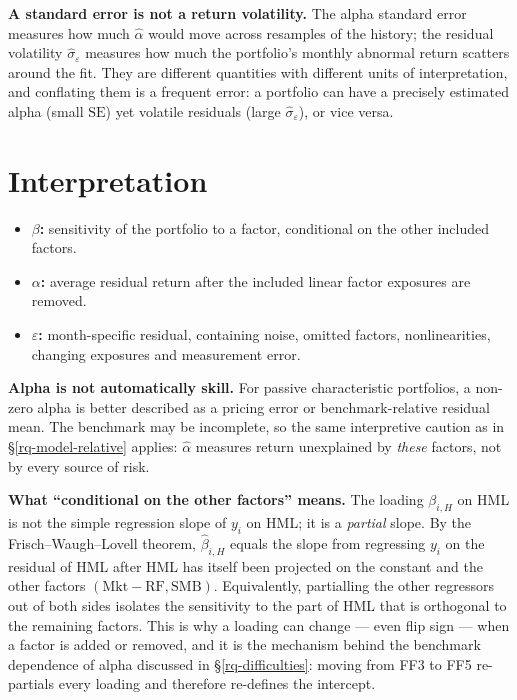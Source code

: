 \textbf{A standard error is not a return volatility.} The alpha standard
error measures how much $\hat\alpha$ would move across resamples of the
history; the residual volatility $\hat\sigma_\varepsilon$ measures how much
the portfolio's monthly abnormal return scatters around the fit. They are
different quantities with different units of interpretation, and conflating
them is a frequent error: a portfolio can have a precisely estimated alpha
(small $\mathrm{SE}$) yet volatile residuals (large
$\hat\sigma_\varepsilon$), or vice versa.

\hypertarget{toy-example-interpretation}{%
\section{Interpretation}\label{toy-example-interpretation}}

\begin{itemize}
\tightlist
\item
  \textbf{\ensuremath{\beta }:} sensitivity of the portfolio to a factor, conditional on
  the other included factors.
\item
  \textbf{\ensuremath{\alpha }:} average residual return after the included linear factor
  exposures are removed.
\item
  \textbf{\ensuremath{\varepsilon }:} month-specific residual, containing noise, omitted
  factors, nonlinearities, changing exposures and measurement error.
\end{itemize}

\textbf{Alpha is not automatically skill.} For passive characteristic
portfolios, a non-zero alpha is better described as a pricing error or
benchmark-relative residual mean. The benchmark may be incomplete, so the
same interpretive caution as in \S\ref{rq-model-relative} applies:
$\hat\alpha$ measures return unexplained by \emph{these} factors, not by
every source of risk.

\textbf{What ``conditional on the other factors'' means.} The loading
$\beta_{i,H}$ on HML is not the simple regression slope of $y_i$ on HML; it
is a \emph{partial} slope. By the Frisch--Waugh--Lovell theorem, $\hat\beta_{i,H}$
equals the slope from regressing $y_i$ on the residual of HML after HML has
itself been projected on the constant and the other factors
$(\mathrm{Mkt}\!-\!\mathrm{RF},\mathrm{SMB})$. Equivalently, partialling the
other regressors out of both sides isolates the sensitivity to the part of
HML that is orthogonal to the remaining factors. This is why a loading can
change --- even flip sign --- when a factor is added or removed, and it is
the mechanism behind the benchmark dependence of alpha discussed in
\S\ref{rq-difficulties}: moving from FF3 to FF5 re-partials every loading
and therefore re-defines the intercept.

